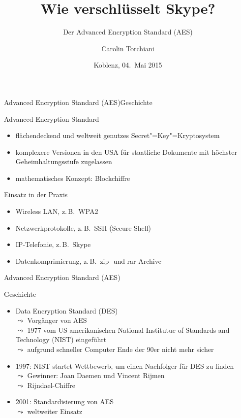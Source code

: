 \documentclass{beamer}
\title[AES]{Wie verschlüsselt Skype?}
\subtitle{Der Advanced Encryption Standard (AES)}
\author[Torchiani]{Carolin Torchiani}
\institute[Uni Koblenz]{\vspace{-0.5cm}\begin{center}
 \texttt{[image: logo\_uni-koblenz]}
\end{center}
}
\date{Koblenz, 04.\ Mai 2015}
\theoremstyle{plain}
\begin{document}
\frame{\titlepage}



                      
\begin{frame}{Advanced Encryption Standard (AES)}{Geschichte}
 
 \begin{block}{Advanced Encryption Standard}
 \begin{itemize}
  \item flächendeckend und weltweit genutzes Secret"=Key"=Kryptosystem
  \item komplexere Versionen in den USA für staatliche Dokumente mit höchster Geheimhaltungsstufe zugelassen
  \item mathematisches Konzept: Blockchiffre
 \end{itemize}
 \end{block}
 
 \begin{block}{Einsatz in der Praxis}
  \begin{itemize}
   \item Wireless LAN, z.\,B.~WPA2
   \item Netzwerkprotokolle, z.\,B.~SSH (Secure Shell)
   \item IP-Telefonie, z.\,B.~Skype
   \item Datenkomprimierung, z.\,B.~zip- und rar-Archive
  \end{itemize}
 \end{block}

\end{frame}

\begin{frame}{Advanced Encryption Standard (AES)}{\ }

\begin{block}{Geschichte}
 \begin{itemize}[<+->]
  \item Data Encryption Standard (DES)\\
  $\leadsto$ Vorgänger von AES\\
  $\leadsto$ 1977 vom US-amerikanischen National Institutue of Standards and Technology (NIST) eingeführt\\
  $\leadsto$ aufgrund schneller Computer Ende der 90er nicht mehr sicher
  \item 1997: NIST startet Wettbewerb, um einen Nachfolger für DES zu finden\\
  $\leadsto$ Gewinner: Joan Daemen und Vincent Rijmen\\
  $\leadsto$ Rijndael-Chiffre
  \item 2001: Standardisierung von AES\\
  $\leadsto$ weltweiter Einsatz
 \end{itemize}
\end{block}
\end{frame}
\end{document}
